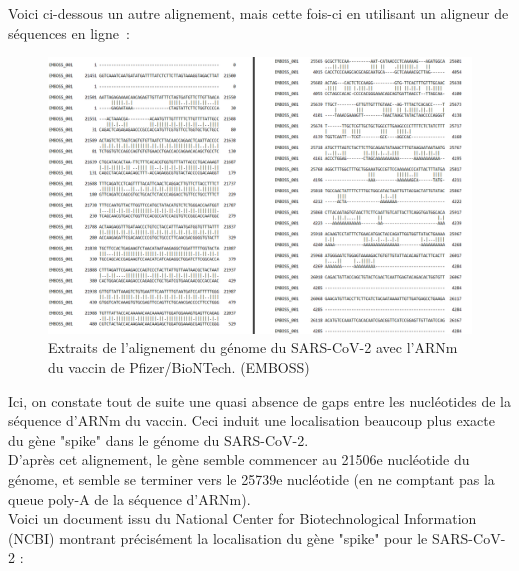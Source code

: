 \documentclass[12pt]{article}
\begin{document}
\newpage
Voici  ci-dessous un autre alignement, mais cette fois-ci en utilisant un aligneur de séquences en ligne~\cite{EMBOSS}:


\begin{figure}[!h]
    \centering
    \includegraphics[scale = 0.45]{Images/Needleman/emboss needleman.png}
    \caption{Extraits de l'alignement du génome du SARS-CoV-2 avec l'ARNm du vaccin de Pfizer/BioNTech. (EMBOSS)}
\end{figure}

Ici, on constate tout de suite une quasi absence de gaps entre les nucléotides de la séquence d'ARNm du vaccin. Ceci induit une localisation beaucoup plus exacte du gène "spike" dans le génome du SARS-CoV-2.\\
D'après cet alignement, le gène semble commencer au 21506e nucléotide du génome, et semble se terminer vers le 25739e nucléotide (en ne comptant pas la queue poly-A de la séquence d'ARNm).\\

Voici un document issu du National Center for Biotechnological Information (NCBI) montrant précisément la localisation du gène "spike" pour le SARS-CoV-2 \cite{SPIKE} :
\end{document}
